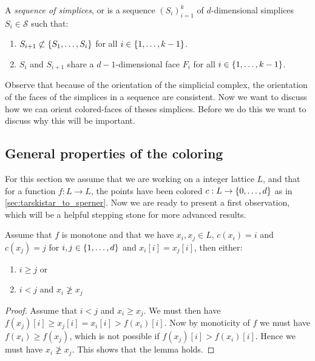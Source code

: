 \begin{definition}
	\label{def:sequence_of_simplices}
	A \emph{sequence of simplices}, or  is a sequence $\left(S_i\right)_{i=1}^{k}$ of $d$-dimensional simplices $S_i \in \mathcal{S}$ such that:
	\begin{enumerate}
		\item $S_{i+1} \not\subset \left\{S_1, \dots, S_i\right\}$ for all $i \in \left\{1, \dots, k-1\right\}$.
		\item $S_i$ and $S_{i+1}$ share a $d-1$-dimensional face $F_i$ for all $i \in \left\{1, \dots, k-1\right\}$.
	\end{enumerate}
\end{definition}

Observe that because of the orientation of the simplicial complex, the orientation of the faces of the simplices in a sequence are consistent. Now we want to discuss how we can orient colored-faces of theses simplices. Before we do this we want to discuss why this will be important.




\subsection{General properties of the coloring}

For this section we assume that we are working on a integer lattice $L$, and that for a function $f : L \rightarrow L$, the points have been colored $c : L \rightarrow \left\{0, \dots, d\right\}$ as in \cref{sec:tarskistar_to_sperner}. Now we are ready to present a first observation, which will be a helpful stepping stone for more advanced results.

\begin{lemma}
	\label{lem:monotone_coloring}
	Assume that $f$ is monotone and that we have $x_i, x_j \in L$, $c(x_i) = i$ and $c(x_j) = j$ for $i, j \in \left\{1, \dots, d\right\}$ and $x_i[i] = x_j[i]$, then either:
	\begin{enumerate}
		\item $i \geq j$ or
		\item $i < j$  and $x_i \not\geq x_j$
	\end{enumerate}
\end{lemma}
\begin{proof}
	Assume that $i < j$ and $x_i \geq x_j$. We must then have $f(x_j)[i] \geq x_j[i] = x_i[i] > f(x_i)[i]$. Now by monoticity of $f$ we must have $f(x_i) \geq f(x_j)$, which is not possible if $f(x_j)[i] > f(x_i)[i]$. Hence we must have $x_i \not\geq x_j$. This shows that the lemma holds.
\end{proof}

